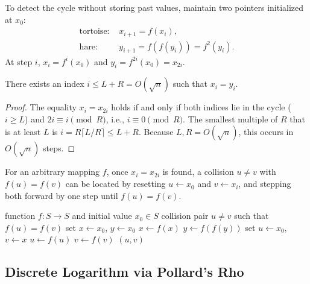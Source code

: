 To detect the cycle without storing past values, maintain two pointers initialized at \(x_0\):
\begin{align*}
    \text{tortoise: } & x_{i+1} = f(x_i), \\
    \text{hare: }     & y_{i+1} = f(f(y_i)) = f^2(y_i).
\end{align*}
At step \(i\), \(x_i = f^i(x_0)\) and \(y_i = f^{2i}(x_0) = x_{2i}\).

\begin{lemma}\label{lem:floyd-cycle}
    There exists an index \(i \leq L + R = O(\sqrt{n})\) such that \(x_i = y_i\).
\end{lemma}

\begin{proof}
    The equality \(x_i = x_{2i}\) holds if and only if both indices lie in the cycle (\(i \geq L\)) and \(2i \equiv i \pmod{R}\), i.e., \(i \equiv 0 \pmod{R}\).
    The smallest multiple of \(R\) that is at least \(L\) is \(i = R \lceil L/R \rceil \leq L + R\).
    Because \(L, R = O(\sqrt{n})\), this occurs in \(O(\sqrt{n})\) steps.
\end{proof}

For an arbitrary mapping \(f\), once \(x_i = x_{2i}\) is found, a collision \(u \neq v\) with \(f(u) = f(v)\) can be located by resetting \(u \gets x_0\) and \(v \gets x_i\), and stepping both forward by one step until \(f(u) = f(v)\).

\begin{algorithm}[H]
    \caption{Floyd's Cycle-Finding Collision Search}\label{alg:floyd-collision}
    \begin{algorithmic}[1]
        \Input function \(f \colon S \to S\) and initial value \(x_0 \in S\)
        \Output collision pair \(u \neq v\) such that \(f(u) = f(v)\)
        \State set \(x \gets x_0\), \(y \gets x_0\)
        \Repeat {}
            \State \(x \gets f(x)\)
            \State \(y \gets f(f(y))\)
        \State set \(u \gets x_0\), \(v \gets x\)
         
            \State \(u \gets f(u)\)
            \State \(v \gets f(v)\)
        \EndWhile
        \State \Return \((u, v)\)
    \end{algorithmic}
\end{algorithm}

\subsection*{Discrete Logarithm via Pollard's Rho}

